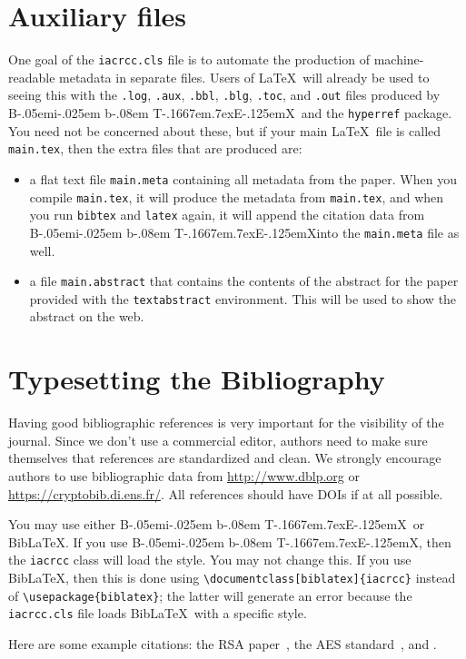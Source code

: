 \documentclass{iacrcc}
\def\BibTeX{{\rm B\kern-.05em{\sc i\kern-.025em b}\kern-.08em
    T\kern-.1667em\lower.7ex\hbox{E}\kern-.125emX}}
\def\BibLaTeX{Bib\LaTeX}
\begin{document}
\section{Auxiliary files}
One goal of the \texttt{iacrcc.cls}
  file is to automate the production of machine-readable metadata in
  separate files. Users of \LaTeX\ will already be used to seeing this
  with the \texttt{.log}, \texttt{.aux}, \texttt{.bbl}, \texttt{.blg},
  \texttt{.toc}, and \texttt{.out} files produced by \BibTeX\ 
  and the \texttt{hyperref} package.  You need not be concerned about
  these, but if your main \LaTeX\ file is called \texttt{main.tex},
  then the extra files that are produced are:
\begin{itemize}
\item a flat text file \texttt{main.meta} containing all metadata
  from the paper.  When you compile
  \texttt{main.tex}, it will produce the metadata from
  \texttt{main.tex}, and when you run \texttt{bibtex} and
  \texttt{latex} again, it will append the citation data from
  \BibTeX into the \texttt{main.meta} file as well.
\item a file \texttt{main.abstract} that contains
  the contents of the abstract for the paper provided with the
  \texttt{textabstract} environment. This will be used to show
  the abstract on the web.
\end{itemize}

\section{Typesetting the Bibliography}
\label{sec:biblio}

Having good bibliographic references is very important for the
visibility of the journal.  Since we don't use a commercial editor,
authors need to make sure themselves that references are standardized
and clean.  We strongly encourage authors to use bibliographic data
from \url{http://www.dblp.org} or \url{https://cryptobib.di.ens.fr/}.
All references should have DOIs if at all possible.

You may use either \BibTeX\ or \BibLaTeX. If you use \BibTeX,
then the \texttt{iacrcc} class will load the
\verb++ style.  You may not change
this. If you use \BibLaTeX, then this is done using
\verb+\documentclass[biblatex]{iacrcc}+ instead of
\verb+\usepackage{biblatex}+; the latter will generate an error
because the \texttt{iacrcc.cls} file loads \BibLaTeX\ with a
specific style.

Here are some example citations: the RSA paper~\cite{RSA78}, the AES
standard~\cite{AES-FIPS}, and \cite{DBLP:conf/crypto/Kocher96}.
\end{document}
